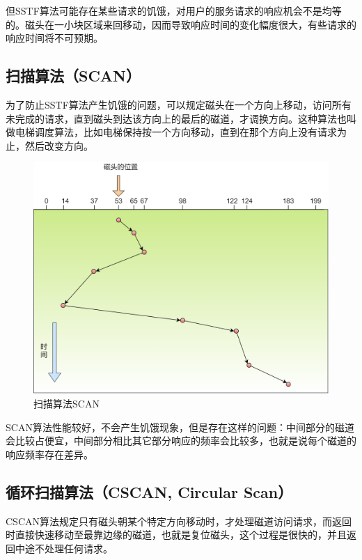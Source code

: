 但SSTF算法可能存在某些请求的饥饿，对用户的服务请求的响应机会不是均等的。磁头在一小块区域来回移动，因而导致响应时间的变化幅度很大，有些请求的响应时间将不可预期。\\

\subsection{扫描算法（SCAN）}

为了防止SSTF算法产生饥饿的问题，可以规定磁头在一个方向上移动，访问所有未完成的请求，直到磁头到达该方向上的最后的磁道，才调换方向。这种算法也叫做电梯调度算法，比如电梯保持按一个方向移动，直到在那个方向上没有请求为止，然后改变方向。

\begin{figure}[H]
    \centering
    \includegraphics[scale=0.35]{img/C4/4-4/3.png}
    \caption{扫描算法SCAN}
\end{figure}

SCAN算法性能较好，不会产生饥饿现象，但是存在这样的问题：中间部分的磁道会比较占便宜，中间部分相比其它部分响应的频率会比较多，也就是说每个磁道的响应频率存在差异。\\

\subsection{循环扫描算法（CSCAN, Circular Scan）}

CSCAN算法规定只有磁头朝某个特定方向移动时，才处理磁道访问请求，而返回时直接快速移动至最靠边缘的磁道，也就是复位磁头，这个过程是很快的，并且返回中途不处理任何请求。\\

